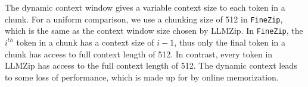 \documentclass[11pt]{article}
\begin{document}
The dynamic context window gives a variable context size to each token in a chunk. For a uniform comparison, we use a chunking size of 512 in \texttt{FineZip}, which is the same as the context window size chosen by LLMZip. In \texttt{FineZip}, the $i^{th}$ token in a chunk has a context size of $i-1$, thus only the final token in a chunk has access to full context length of 512. In contrast, every token in LLMZip has access to the full context length of 512. The dynamic context leads to some loss of performance, which is made up for by online memorization.




    




\end{document}
